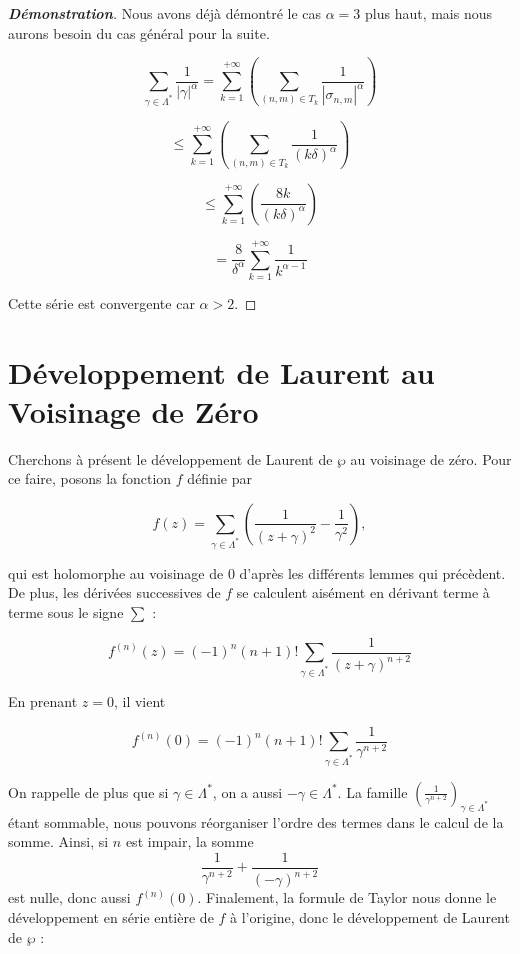 \documentclass[12pt]{article}
\begin{document}
                \begin{proof}[\textbf{Démonstration}]
                Nous avons déjà démontré le cas \(\alpha = 3\) plus haut, mais nous aurons besoin du cas général pour la suite.

                \[
                \sum_{\gamma \in \Lambda^*} \frac{1}{|\gamma|^\alpha} = \sum_{k=1}^{+\infty} \left( \sum_{(n,m) \in T_k} \frac{1}{|\sigma_{n,m}|^\alpha} \right)
                \]

                \[
                \leq \sum_{k=1}^{+\infty} \left( \sum_{(n,m) \in T_k} \frac{1}{(k\delta)^\alpha} \right)
                \]

                \[
                \leq \sum_{k=1}^{+\infty} \left( \frac{8k}{(k\delta)^\alpha} \right)
                \]

                \[
                = \frac{8}{\delta^\alpha} \sum_{k=1}^{+\infty} \frac{1}{k^{\alpha-1}}
                \]

                Cette série est convergente car \(\alpha > 2\).
                \end{proof}

                \section*{Développement de Laurent au Voisinage de Zéro}

                Cherchons à présent le développement de Laurent de \(\wp\) au voisinage de zéro. Pour ce faire, posons la fonction \(f\) définie par

                \[
                f(z) = \sum_{\gamma \in \Lambda^*} \left( \frac{1}{(z+\gamma)^2} - \frac{1}{\gamma^2} \right),
                \]

                qui est holomorphe au voisinage de 0 d'après les différents lemmes qui précèdent. De plus, les dérivées successives de \(f\) se calculent aisément en dérivant terme à terme sous le signe \(\sum\) :

                \[
                f^{(n)}(z) = (-1)^n (n+1)! \sum_{\gamma \in \Lambda^*} \frac{1}{(z+\gamma)^{n+2}}
                \]

                En prenant \(z=0\), il vient

                \[
                f^{(n)}(0) = (-1)^n (n+1)! \sum_{\gamma \in \Lambda^*} \frac{1}{\gamma^{n+2}}
                \]

                On rappelle de plus que si \(\gamma \in \Lambda^*\), on a aussi \(-\gamma \in \Lambda^*\). La famille \(\left(\frac{1}{\gamma^{n+2}} \right)_{\gamma \in \Lambda^*}\) étant sommable, nous pouvons réorganiser l'ordre des termes dans le calcul de la somme. Ainsi, si \(n\) est impair, la somme
                \[
                \frac{1}{\gamma^{n+2}} + \frac{1}{(-\gamma)^{n+2}}
                \]
                est nulle, donc aussi \(f^{(n)}(0)\). Finalement, la formule de Taylor nous donne le développement en série entière de \(f\) à l'origine, donc le développement de Laurent de \(\wp\) :
\end{document}
